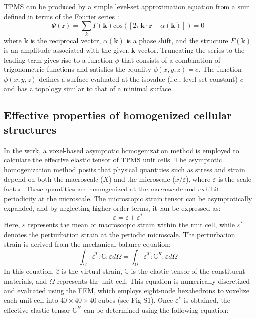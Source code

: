 \documentclass[preprint,review,12pt,authoryear]{elsarticle}
\begin{document}
TPMS can be produced by a simple level-set approximation equation from a sum defined in terms of the Fourier series \citep{Gandy2001,Al-Ketan2019}:
\begin{equation}
 \Psi(\boldsymbol{r})=\sum_kF(\boldsymbol{k})\text{cos}([2\pi \boldsymbol{k}\cdot \boldsymbol{r}-\alpha(\boldsymbol{k})])=0
\label{eq:1}
\end{equation}
where $\boldsymbol{k}$ is the reciprocal vector, $\alpha(\boldsymbol{k})$ is a phase shift, and the structure $F(\boldsymbol{k})$ is an amplitude associated with the given $\boldsymbol{k}$ vector. Truncating the series to the leading term gives rise to a function $\phi$ that consists of a combination of trigonometric functions and satisfies the equality $\phi(x,y,z)=c$. The function $\phi(x, y, z)$ defines a surface evaluated at the isovalue (i.e., level-set constant) $c$ and has a topology similar to that of a minimal surface. 

\subsection{Effective properties of homogenized cellular structures}
\label{subsec:homo}

In the work, a voxel-based asymptotic homogenization method \citep{Dong2019} is employed to calculate the effective elastic tensor of TPMS unit cells. The asymptotic homogenization method posits that physical quantities such as stress and strain depend on both the macroscale ($X$) and the microscale ($x/\varepsilon$), where $\varepsilon$ is the scale factor. These quantities are homogenized at the macroscale and exhibit periodicity at the microscale. The microscopic strain tensor can be asymptotically expanded, and by neglecting higher-order terms, it can be expressed as:
\begin{equation}
    \varepsilon = \bar{\varepsilon} + \varepsilon^{*}
\label{eq:2}
\end{equation}
Here, $\bar{\varepsilon}$ represents the mean or macroscopic strain within the unit cell, while $\varepsilon^{*}$ denotes the perturbation strain at the periodic microscale. The perturbation strain is derived from the mechanical balance equation:
\begin{equation}
\int_{\Omega}\hat{\varepsilon}^T:\mathbb{C}:\varepsilon d\Omega = \int_{\Omega}\hat{\varepsilon}^T:\mathbb{C}^H:\bar{\varepsilon}d\Omega
\label{eq:3}
\end{equation}
In this equation, $\hat{\varepsilon}$ is the virtual strain, $\mathbb{C}$ is the elastic tensor of the constituent materials, and $\Omega$ represents the unit cell. This equation is numerically discretized and evaluated using the FEM, which employs eight-node hexahedrons to voxelize each unit cell into $40 \times 40 \times 40$ cubes (see Fig S1). Once $\varepsilon^{*}$ is obtained, the effective elastic tensor $\mathbb{C}^H$ can be determined using the following equation:
\end{document}
